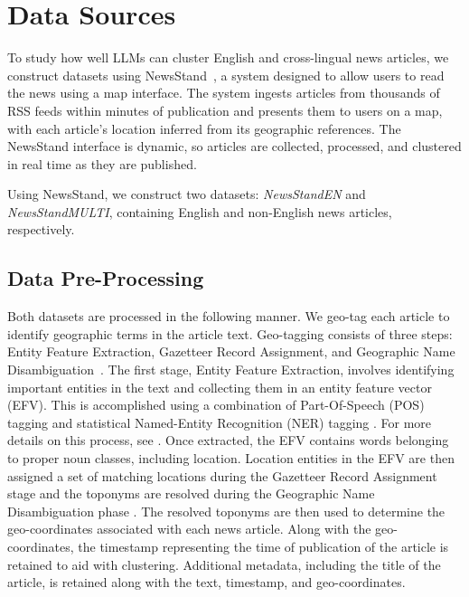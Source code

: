 \section{Data Sources}\label{section:data}

To study how well LLMs can cluster English and cross-lingual news articles, we construct datasets using NewsStand~\cite{Teit08}, a system designed to allow users to read the news using a map interface. 
The system ingests articles from thousands of RSS feeds within minutes of publication and presents them to users on a map, with each article's location inferred from its geographic references. 
The NewsStand interface is dynamic, so articles are collected, processed, and clustered in real time as they are published. 

Using NewsStand, we construct two datasets: \emph{NewsStandEN} and \emph{NewsStandMULTI}, containing English and non-English news articles, respectively.

\subsection{Data Pre-Processing}
Both datasets are processed in the following manner.
We geo-tag each article to identify geographic terms in the article text.
Geo-tagging consists of three steps: Entity Feature Extraction, Gazetteer Record Assignment, and Geographic Name Disambiguation~\cite{Teit08}. 
The first stage, Entity Feature Extraction, involves identifying important entities in the text and collecting them in an entity feature vector (EFV). 
This is accomplished using a combination of Part-Of-Speech (POS) tagging and statistical Named-Entity Recognition (NER) tagging \cite{NER}. 
For more details on this process, see \cite{Same09d, Lieb07, Ho12}. 
Once extracted, the EFV contains words belonging to proper noun classes, including location. 
Location entities in the EFV are then assigned a set of matching locations during the Gazetteer Record Assignment stage and the toponyms are resolved during the Geographic Name Disambiguation phase \cite{Leid11, Lieb10b, Lieb11, Lieb12, Same14b, Schn21}.
The resolved toponyms are then used to determine the geo-coordinates associated with each news article.
Along with the geo-coordinates, the timestamp representing the time of publication of the article is retained to aid with clustering. 
Additional metadata, including the title of the article, is retained along with the text, timestamp, and geo-coordinates.

